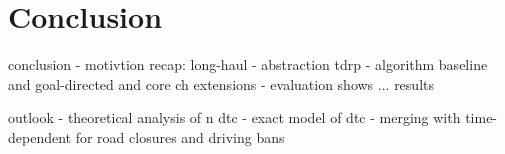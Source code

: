 
\chapter{Conclusion}
\label{ch:conclusion}
conclusion
- motivtion recap: long-haul
- abstraction tdrp
- algorithm baseline and goal-directed and core ch extensions
- evaluation shows ... results


outlook
- theoretical analysis of n dtc
- exact model of dtc
- merging with time-dependent for road closures and driving bans


